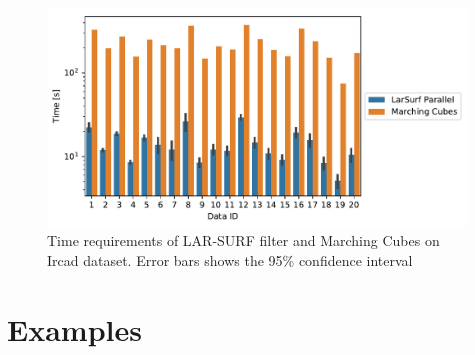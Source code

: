 \documentclass[11pt, oneside]{amsart}   	%
\begin{document}
\begin{figure}
\centering
\includegraphics[width=0.99\textwidth]{figs/ircad_comparison.pdf} 
\caption{Time requirements of LAR-SURF filter and Marching Cubes on Ircad dataset. Error bars shows the 95\% confidence interval}
\label{fig:ircad_comparison}
\end{figure}



%
\section{Examples}\label{sec:examples}
\end{document}
